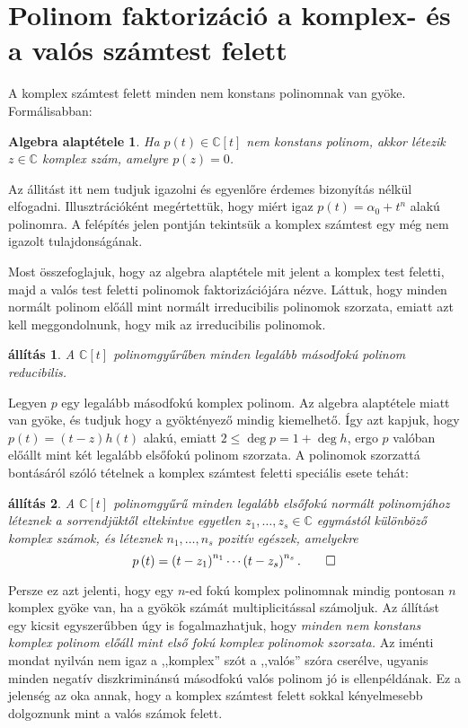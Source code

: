 \documentclass[9pt, showtrims]{memoir}
\makeatletter
\renewenvironment{proof}[1][\proofname]
    {\par\pushQED{\qed}%
    \normalfont \topsep6\p@\@plus6\p@\relax
    \trivlist
    \item[\hskip\labelsep
        \itshape
    #1\@addpunct{:}]\ignorespaces}
    {\popQED\endtrivlist\@endpefalse}
\theoremstyle{plain}
\newtheorem{proposition}{állítás}[section]
\newtheorem*{FA}{Algebra alaptétele}
\theoremstyle{remark}
\theoremstyle{definition}
\makeatother
\begin{document}
\section{Polinom faktorizáció a komplex- és a valós számtest felett}
A komplex számtest felett minden nem konstans polinomnak van gyöke.
Formálisabban:
\begin{FA}
    Ha $p\left( t \right)\in\mathbb{C}[t]$ nem konstans polinom,
    akkor létezik $z\in\mathbb{C}$ komplex szám, 
    amelyre $p\left( z \right)=0$.
\end{FA}
Az állitást itt nem tudjuk igazolni és egyenlőre érdemes bizonyítás nélkül elfogadni.
Illusztrációként megértettük, hogy miért igaz $p\left( t \right)=\alpha_0+t^n$ alakú polinomra.
A felépítés jelen pontján tekintsük a komplex számtest egy még nem igazolt tulajdonságának.

Most összefoglajuk, hogy az algebra alaptétele mit jelent a komplex test feletti, majd a valós test feletti polinomok
faktorizációjára nézve.
Láttuk, hogy minden normált polinom előáll mint normált irreducibilis polinomok szorzata,
emiatt azt kell meggondolnunk, hogy mik az irreducibilis polinomok.
\begin{proposition}
    A $\mathbb{C}\left[ t \right]$ polinomgyűrűben minden legalább másodfokú polinom reducibilis.
\end{proposition}
\begin{proof}
    Legyen $p$ egy legalább másodfokú komplex polinom.
    Az algebra alaptétele miatt van gyöke, és
    tudjuk hogy a gyöktényező mindig kiemelhető.
    Így azt kapjuk, hogy $p(t)=\left( t-z \right)h\left( t \right)$ alakú,
    emiatt $2\leq\deg p=1+\deg h$, ergo
    $p$ valóban előállt mint két legalább elsőfokú polinom szorzata.
\end{proof}
A polinomok szorzattá bontásáról szóló tételnek a komplex számtest feletti speciális esete tehát:
\begin{proposition}
    A $\mathbb{C}[t]$ polinomgyűrű minden legalább elsőfokú normált polinomjához léteznek
    a sorrendjüktől eltekintve egyetlen $z_1,\dots,z_s\in\mathbb{C}$ egymástól különböző komplex számok,
    és léteznek $n_1,\dots,n_s$ pozitív egészek, 
    amelyekre
    \[
        p\left( t \right)=
        \left( t-z_1 \right)^{n_1}
        \cdots
        \left( t-z_s\right)^{n_s}.\qedhere
    \]
\end{proposition}
Persze ez azt jelenti, hogy egy $n$-ed fokú komplex polinomnak mindig pontosan $n$ komplex gyöke van, 
ha a gyökök számát multiplicitással számoljuk.
Az állítást egy kicsit egyszerűbben úgy is fogalmazhatjuk, 
hogy 
\emph{
    minden nem konstans komplex polinom előáll mint első fokú komplex polinomok szorzata.
}
Az iménti mondat nyilván nem igaz a ,,komplex'' szót a ,,valós'' szóra cserélve, 
ugyanis minden negatív diszkriminánsú másodfokú valós polinom jó is ellenpéldának.
Ez a jelenség az oka annak, 
hogy a komplex számtest felett sokkal kényelmesebb dolgoznunk mint a valós számok felett.
\end{document}
